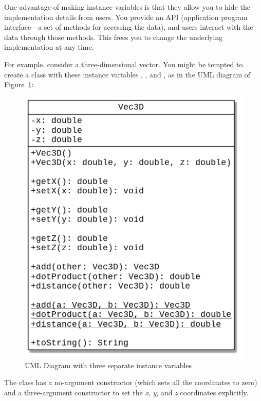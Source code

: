 \begin{exercise}
One advantage of making instance variables  is that they allow you to hide the implementation details from users. You provide an API (application program interface---a set of methods for accessing the data), and users interact with the data through those methods. This frees you to change the underlying implementation at any time.

For example, consider a three-dimensional vector. You might be tempted to create a class with these instance variables , , and , as in the UML diagram of Figure~\ref{fig.vec3d_a}:

\begin{figure}[!h]
\begin{center}
\includegraphics[scale=0.5]{figs/vec3d_a.png}
\caption{UML Diagram with three separate instance variables}
\label{fig.vec3d_a}
\end{center}
\end{figure}

The class has a no-argument constructor (which sets all the coordinates to zero) and a three-argument constructor to set the {\em x}, {\em y}, and {\em z} coordinates explicitly.


\end{exercise}
